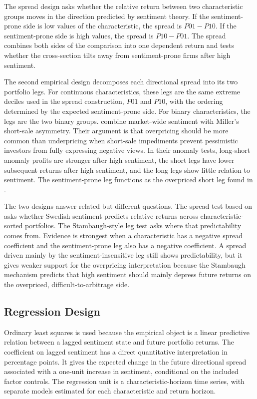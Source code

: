 \documentclass[11pt]{article}
\newcommand{\var}[1]{\ensuremath{#1}}
\begin{document}
The spread design asks whether the relative return between two characteristic groups moves in the direction predicted by sentiment theory. If the sentiment-prone side is low values of the characteristic, the spread is \var{P01-P10}. If the sentiment-prone side is high values, the spread is \var{P10-P01}. The spread combines both sides of the comparison into one dependent return and tests whether the cross-section tilts away from sentiment-prone firms after high sentiment.

The second empirical design decomposes each directional spread into its two portfolio legs. For continuous characteristics, these legs are the same extreme deciles used in the spread construction, \var{P01} and \var{P10}, with the ordering determined by the expected sentiment-prone side. For binary characteristics, the legs are the two binary groups. \citet{stambaugh2012short} combine market-wide sentiment with Miller's short-sale asymmetry. Their argument is that overpricing should be more common than underpricing when short-sale impediments prevent pessimistic investors from fully expressing negative views. In their anomaly tests, long-short anomaly profits are stronger after high sentiment, the short legs have lower subsequent returns after high sentiment, and the long legs show little relation to sentiment. The sentiment-prone leg functions as the overpriced short leg found in \citet{stambaugh2012short}.

The two designs answer related but different questions. The spread test based on \citet{baker2006sentiment} asks whether Swedish sentiment predicts relative returns across characteristic-sorted portfolios. The Stambaugh-style leg test asks where that predictability comes from. Evidence is strongest when a characteristic has a negative spread coefficient and the sentiment-prone leg also has a negative coefficient. A spread driven mainly by the sentiment-insensitive leg still shows predictability, but it gives weaker support for the overpricing interpretation because the Stambaugh mechanism predicts that high sentiment should mainly depress future returns on the overpriced, difficult-to-arbitrage side.

\subsection{Regression Design}
Ordinary least squares is used because the empirical object is a linear predictive relation between a lagged sentiment state and future portfolio returns. The coefficient on lagged sentiment has a direct quantitative interpretation in percentage points. It gives the expected change in the future directional spread associated with a one-unit increase in sentiment, conditional on the included factor controls. The regression unit is a characteristic-horizon time series, with separate models estimated for each characteristic and return horizon.
\end{document}
